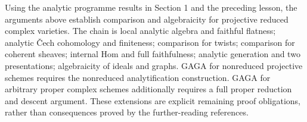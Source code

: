 \documentclass[11pt]{article}
\begin{document}
Using the analytic programme results in Section 1 and the preceding
lesson, the arguments above establish comparison and algebraicity for
projective reduced complex varieties. The chain is local analytic
algebra and faithful flatness; analytic Čech cohomology and finiteness;
comparison for twists; comparison for coherent sheaves; internal Hom and
full faithfulness; analytic generation and two presentations;
algebraicity of ideals and graphs. GAGA for nonreduced projective
schemes requires the nonreduced analytification construction. GAGA for
arbitrary proper complex schemes additionally requires a full proper
reduction and descent argument. These extensions are explicit remaining
proof obligations, rather than consequences proved by the
further-reading references.
\end{document}
